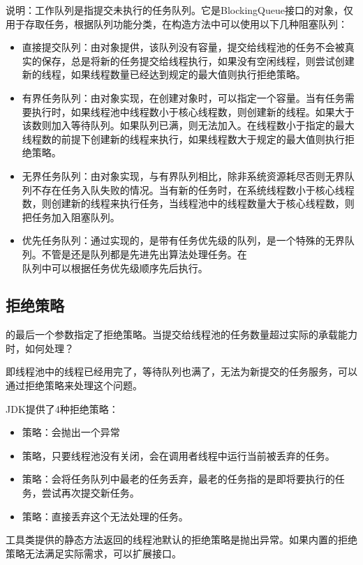 \documentclass[a4paper]{report}
\begin{document}
说明：工作队列是指提交未执行的任务队列。它是BlockingQueue接口的对象，仅用于存取任务，根据队列功能分类，在构造方法中可以使用以下几种阻塞队列：
\begin{itemize}
  \item 直接提交队列：由对象提供，该队列没有容量，提交给线程池的任务不会被真实的保存，总是将新的任务提交给线程执行，如果没有空闲线程，则尝试创建新的线程，如果线程数量已经达到规定的最大值则执行拒绝策略。
  \item 有界任务队列：由对象实现，在创建对象时，可以指定一个容量。当有任务需要执行时，如果线程池中线程数小于核心线程数，则创建新的线程。如果大于该数则加入等待队列。如果队列已满，则无法加入。在线程数小于指定的最大线程数的前提下创建新的线程来执行，如果线程数大于规定的最大值则执行拒绝策略。
  \item 无界任务队列：由对象实现，与有界队列相比，除非系统资源耗尽否则无界队列不存在任务入队失败的情况。当有新的任务时，在系统线程数小于核心线程数，则创建新的线程来执行任务，当线程池中的线程数量大于核心线程数，则把任务加入阻塞队列。
  \item 优先任务队列：通过实现的，是带有任务优先级的队列，是一个特殊的无界队列。不管是还是队列都是先进先出算法处理任务。在\\ 队列中可以根据任务优先级顺序先后执行。
\end{itemize}
\subsection{拒绝策略}
的最后一个参数指定了拒绝策略。当提交给线程池的任务数量超过实际的承载能力时，如何处理？

即线程池中的线程已经用完了，等待队列也满了，无法为新提交的任务服务，可以通过拒绝策略来处理这个问题。

JDK提供了4种拒绝策略：
\begin{itemize}
  \item {}策略：会抛出一个异常
  \item {}策略，只要线程池没有关闭，会在调用者线程中运行当前被丢弃的任务。
  \item {}策略：会将任务队列中最老的任务丢弃，最老的任务指的是即将要执行的任务，尝试再次提交新任务。
  \item {}策略：直接丢弃这个无法处理的任务。
\end{itemize}
工具类提供的静态方法返回的线程池默认的拒绝策略是抛出异常。如果内置的拒绝策略无法满足实际需求，可以扩展接口。
\end{document}
